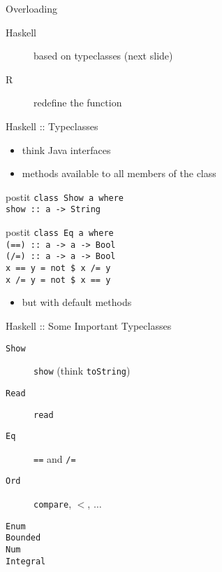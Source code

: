 \documentclass{beamer}
\begin{document}
\begin{frame}{Overloading}
  \begin{description}
    \item[Haskell] based on typeclasses (next slide)
    \item[R] redefine the function
  \end{description}
\end{frame}

\begin{frame}{Haskell :: Typeclasses}
  \begin{itemize}
    \item think Java interfaces
    \item methods available to all members of the class
  \end{itemize}
  \begin{beamercolorbox}[wd=\textwidth,rounded=true,shadow=true]{postit}
    \texttt{class Show a where\\
      \hspace{1em}show :: a -> String
    }
  \end{beamercolorbox}
  \pause
  \begin{beamercolorbox}[wd=\textwidth,rounded=true,shadow=true]{postit}
    \texttt{class Eq a where\\
      \hspace{1em}(==) :: a -> a -> Bool\\
      \hspace{1em}(/=) :: a -> a -> Bool\\
      \hspace{1em}x == y = not \$ x /= y\\
      \hspace{1em}x /= y = not \$ x == y
    }
  \end{beamercolorbox}
  \begin{itemize}
    \item but with default methods
  \end{itemize}
\end{frame}

\begin{frame}{Haskell :: Some Important Typeclasses}
  \begin{description}
    \item[{\texttt{Show}}] \texttt{show} (think \texttt{toString})
    \item[{\texttt{Read}}] \texttt{read}
    \item[{\texttt{Eq}}] \texttt{==} and \texttt{/=}
    \item[{\texttt{Ord}}] \texttt{compare}, \texttt{$<$}, $\ldots$
    \item[{\texttt{Enum}}]
    \item[{\texttt{Bounded}}]
    \item[{\texttt{Num}}]
    \item[{\texttt{Integral}}]
  \end{description}
\end{frame}
\end{document}
